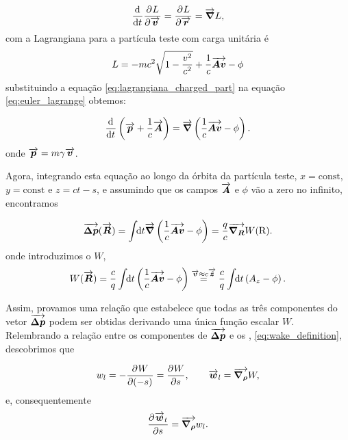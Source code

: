 \begin{equation}\label{eq:euler_lagrange}
    \frac{\mathrm{d}^{{}}}{\mathrm{d} t^{{}}}\frac{\partial^{{}}L}{\partial \overrightarrow{\boldsymbol{v}}^{{}}} = \frac{\partial^{{}}L}{\partial \overrightarrow{\boldsymbol{r}}^{{}}} = \overrightarrow{\boldsymbol{\nabla}}L,
\end{equation}
com a Lagrangiana para a partícula teste com carga unitária é
\begin{equation}\label{eq:lagrangiana_charged_part}
   L = -mc^2 \sqrt{1 - \frac{v^2}{c^2}} + \frac1c \overrightarrow{\boldsymbol{Av}} - \phi
\end{equation}
substituindo a equação \ref{eq:lagrangiana_charged_part} na equação \ref{eq:euler_lagrange} obtemos:

\begin{equation}
 \frac{\mathrm{d}^{{}}}{\mathrm{d} t^{{}}} \left(\overrightarrow{\boldsymbol{p}} + \frac1c \overrightarrow{\boldsymbol{A}}\right) = \overrightarrow{\boldsymbol{\nabla}}\left(\frac1c \overrightarrow{\boldsymbol{Av}} - \phi\right).
\end{equation}
onde $\overrightarrow{\boldsymbol{p}} = m\gamma\overrightarrow{\boldsymbol{v}}$.

Agora, integrando esta equação ao longo da órbita da partícula teste, $x=\mathrm{const}$, $y=\mathrm{const}$ e $z = ct-s$, e assumindo que os campos $\overrightarrow{\boldsymbol{A}}$ e $\phi$ vão a zero no infinito, encontramos

\begin{equation}
 \overrightarrow{\boldsymbol{\Delta p}}(\overrightarrow{\boldsymbol{R}}) = \int\!\!\text{d}t \overrightarrow{\boldsymbol{\nabla}}\left(\frac1c\overrightarrow{\boldsymbol{Av}} - \phi \right) = \frac{q}{c} \overrightarrow{\boldsymbol{\nabla_R}}W(\mathrm{R}).
\end{equation}
onde introduzimos o  $W$,
\begin{equation}
 W(\overrightarrow{\boldsymbol{R}}) = \frac{c}{q}\int\!\!\text{d}t \left(\frac1c \overrightarrow{\boldsymbol{Av}} -\phi\right)
      \overset{\overrightarrow{\boldsymbol{v}} \approx c\overrightarrow{\boldsymbol{\hat{z}}}}{=}
                 \frac{c}{q}\int\!\!\text{d}t \left(A_z -\phi\right).
\end{equation}

Assim, provamos uma relação que estabelece que todas as três componentes do vetor $\overrightarrow{\boldsymbol{\Delta p}}$ podem ser obtidas derivando uma única função escalar $W$. Relembrando a relação entre os componentes de $\overrightarrow{\boldsymbol{\Delta p}}$ e os , \ref{eq:wake_definition}, descobrimos que

\begin{equation}\label{eq:wake_function_definition}
 w_l = - \frac{\partial^{{}}W}{\partial (-s)^{{}}} = \frac{\partial^{{}}W}{\partial s^{{}}},\qquad \overrightarrow{\boldsymbol{w}}_l = \overrightarrow{\boldsymbol{\nabla_\rho}}W,
\end{equation}
e, consequentemente
\begin{equation}\label{eq:panofsky_wenzel_theorem}
 \frac{\partial^{{}}\overrightarrow{\boldsymbol{w}}_t}{\partial s^{{}}} = \overrightarrow{\boldsymbol{\nabla_\rho}}w_l.
\end{equation}

